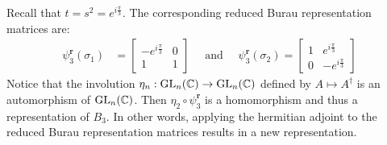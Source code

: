 \begin{example}
    Recall that $t=s^2=e^{i\frac{\pi}{3}}$. The corresponding reduced Burau representation matrices are:
    \begin{align*}
        \psi_3^\textbf{r}(\sigma_1) &= \begin{bmatrix}
            -e^{i\frac{\pi}{3}} & 0 \\
            1 & 1
        \end{bmatrix} \quad \textrm{ and } \quad
        \psi_3^\textbf{r}(\sigma_2) = \begin{bmatrix}
            1 & e^{i\frac{\pi}{3}} \\
            0 & -e^{i\frac{\pi}{3}}
        \end{bmatrix}
    \end{align*}
    Notice that the involution $\eta_n:\textrm{GL}_n(\mathbb{C})\to\textrm{GL}_n(\mathbb{C})$ defined by $A \mapsto A^\dagger$ is an automorphism of $\textrm{GL}_n(\mathbb{C})$. Then $\eta_2\circ\psi_3^\textbf{r}$ is a homomorphism and thus a representation of $B_3$. In other words, applying the hermitian adjoint to the reduced Burau representation matrices results in a new representation.


\end{example}
